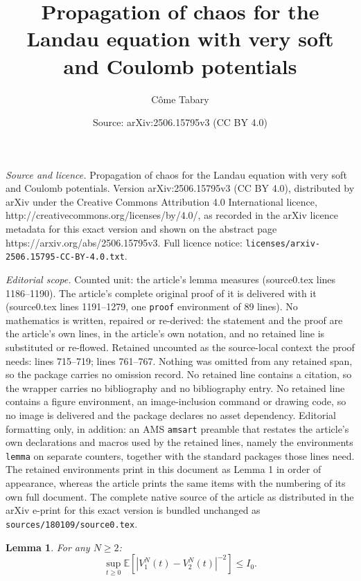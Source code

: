 \documentclass[10pt,a4paper]{amsart}
\title{Propagation of chaos for the Landau equation with very soft and Coulomb potentials}
\author{C\^ome Tabary}
\date{Source: arXiv:2506.15795v3 (CC BY 4.0)}
\newtheorem{lemma}{Lemma}
\begin{document}
\maketitle

\noindent\emph{Source and licence.} Propagation of chaos for the Landau equation with very soft and Coulomb potentials. Version arXiv:2506.15795v3 (CC BY 4.0), distributed by arXiv under the Creative Commons Attribution 4.0 International licence, http://creativecommons.org/licenses/by/4.0/, as recorded in the arXiv licence metadata for this exact version and shown on the abstract page https://arxiv.org/abs/2506.15795v3. Full licence notice: \texttt{licenses/arxiv-2506.15795-CC-BY-4.0.txt}.\par\smallskip

\noindent\textit{Editorial scope.} Counted unit: the article's lemma measures (source0.tex lines 1186--1190). The article's complete original proof of it is delivered with it (source0.tex lines 1191--1279, one \texttt{proof} environment of 89 lines). No mathematics is written, repaired or re-derived: the statement and the proof are the article's own lines, in the article's own notation, and no retained line is substituted or re-flowed.  Retained uncounted as the source-local context the proof needs: lines 715--719; lines 761--767.  Nothing was omitted from any retained span, so the package carries no omission record.  No retained line contains a citation, so the wrapper carries no bibliography and no bibliography entry.  No retained line contains a figure environment, an image-inclusion command or drawing code, so no image is delivered and the package declares no asset dependency.  Editorial formatting only, in addition: an AMS \texttt{amsart} preamble that restates the article's own declarations and macros used by the retained lines, namely the environments \texttt{lemma} on separate counters, together with the standard packages those lines need.  The retained environments print in this document as Lemma 1 in order of appearance, whereas the article prints the same items with the numbering of its own full document.  The complete native source of the article as distributed in the arXiv e-print for this exact version is bundled unchanged as \texttt{sources/180109/source0.tex}.
\begin{lemma}
\label{lem:keyestimate}
    For any $N\geq 2$:
    $$\sup_{t\geq 0} \mathbb{E}\left[ \left\vert V^N_1(t) - V^N_2(t)\right\vert^{-2} \right] \leq I_0.$$
\end{lemma}
\end{document}
